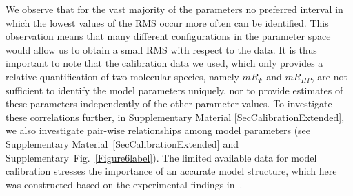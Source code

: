 \documentclass[oneside, 10pt, a4paper, twocolumn]{article}
\begin{document}
We observe that for the vast majority of the parameters no preferred interval in which the lowest values of the RMS occur more often can be identified. %
This observation means that many different configurations in the parameter space would allow us to obtain a small RMS with respect to the data. 
{It is thus important to note that the calibration data we used, which only provides a relative quantification of
two molecular species, namely $mR_{F}$ and $mR_{HP}$, are not sufficient to identify the model parameters uniquely, 
nor to provide estimates of these parameters independently of the other parameter values. } %
{To investigate these correlations further, in Supplementary Material \ref{SecCalibrationExtended}, 
we also investigate pair-wise relationships among model parameters (see Supplementary Material~\ref{SecCalibrationExtended} 
and Supplementary~Fig.~\ref{Figure6label}). 
The limited available data for model calibration stresses the importance
of an accurate model structure, which here was constructed based on the experimental findings in~\cite{Schmollinger2013}.}
\end{document}

